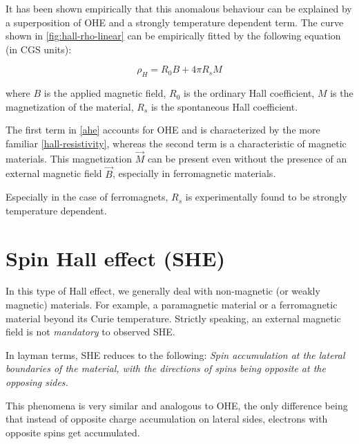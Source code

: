 It has been shown empirically that this anomalous behaviour can be explained by a superposition of OHE and a strongly temperature dependent term. 
The curve shown in \cref{fig:hall-rho-linear} 
can be empirically fitted by the following equation (in CGS units):

\begin{equation} \label{ahe} 
    \rho_H = R_0 B + 4 \pi R_s M
\end{equation}

where $ B $ is the applied magnetic field, $ R_0 $ is the ordinary Hall coefficient, $ M $ is the magnetization of the material, $ R_s $ is the spontaneous Hall coefficient.

The first term in \cref{ahe} accounts for OHE and is characterized by the more familiar \cref{hall-resistivity}, whereas the second term is a characteristic of magnetic materials. 
This magnetization $ \vec{M} $ can be present even without the presence of an external magnetic field $ \vec{B} $, especially in ferromagnetic materials.

Especially in the case of ferromagnets, $ R_s $ is experimentally found to be strongly temperature dependent.














\section{Spin Hall effect (SHE)}

In this type of Hall effect, we generally deal with non-magnetic (or weakly magnetic) materials. 
For example, a paramagnetic material or a ferromagnetic material beyond its Curie temperature.
Strictly speaking, an external magnetic field is not \textit{mandatory} to observed SHE.

In layman terms, SHE reduces to the following: \textit{Spin accumulation at the lateral boundaries of the material, with the directions of spins being opposite at the opposing sides.}

This phenomena is very similar and analogous to OHE, the only difference being that instead of opposite charge accumulation on lateral sides, electrons with opposite spins get accumulated.



